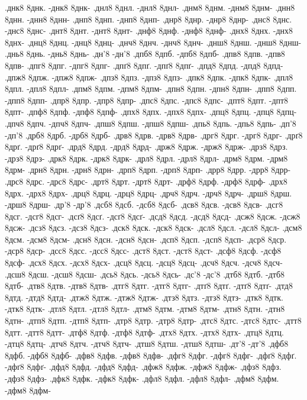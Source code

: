 {.днк8 8днк. -днк8 8днк-
.днл8 8днл. -днл8 8днл-
.днм8 8днм. -днм8 8днм-
.днн8 8днн. -днн8 8днн-
.днп8 8днп. -днп8 8днп-
.днр8 8днр. -днр8 8днр-
.днс8 8днс. -днс8 8днс-
.днт8 8днт. -днт8 8днт-
.днф8 8днф. -днф8 8днф-
.днх8 8днх. -днх8 8днх-
.днц8 8днц. -днц8 8днц-
.днч8 8днч. -днч8 8днч-
.днш8 8днш. -днш8 8днш-
.днь8 8днь. -днь8 8днь-
.дн'8 -дн'8
.дпб8 8дпб. -дпб8 8дпб-
.дпв8 8дпв. -дпв8 8дпв-
.дпг8 8дпг. -дпг8 8дпг-
.дпґ8 8дпґ. -дпґ8 8дпґ-
.дпд8 8дпд. -дпд8 8дпд-
.дпж8 8дпж. -дпж8 8дпж-
.дпз8 8дпз. -дпз8 8дпз-
.дпк8 8дпк. -дпк8 8дпк-
.дпл8 8дпл. -дпл8 8дпл-
.дпм8 8дпм. -дпм8 8дпм-
.дпн8 8дпн. -дпн8 8дпн-
.дпп8 8дпп. -дпп8 8дпп-
.дпр8 8дпр. -дпр8 8дпр-
.дпс8 8дпс. -дпс8 8дпс-
.дпт8 8дпт. -дпт8 8дпт-
.дпф8 8дпф. -дпф8 8дпф-
.дпх8 8дпх. -дпх8 8дпх-
.дпц8 8дпц. -дпц8 8дпц-
.дпч8 8дпч. -дпч8 8дпч-
.дпш8 8дпш. -дпш8 8дпш-
.дпь8 8дпь. -дпь8 8дпь-
.дп'8 -дп'8
.дрб8 8дрб. -дрб8 8дрб-
.дрв8 8дрв. -дрв8 8дрв-
.дрг8 8дрг. -дрг8 8дрг-
.дрґ8 8дрґ. -дрґ8 8дрґ-
.дрд8 8дрд. -дрд8 8дрд-
.држ8 8држ. -држ8 8држ-
.дрз8 8дрз. -дрз8 8дрз-
.дрк8 8дрк. -дрк8 8дрк-
.дрл8 8дрл. -дрл8 8дрл-
.дрм8 8дрм. -дрм8 8дрм-
.дрн8 8дрн. -дрн8 8дрн-
.дрп8 8дрп. -дрп8 8дрп-
.дрр8 8дрр. -дрр8 8дрр-
.дрс8 8дрс. -дрс8 8дрс-
.дрт8 8дрт. -дрт8 8дрт-
.дрф8 8дрф. -дрф8 8дрф-
.дрх8 8дрх. -дрх8 8дрх-
.дрц8 8дрц. -дрц8 8дрц-
.дрч8 8дрч. -дрч8 8дрч-
.дрш8 8дрш. -дрш8 8дрш-
.др'8 -др'8
.дсб8 8дсб. -дсб8 8дсб-
.дсв8 8дсв. -дсв8 8дсв-
.дсг8 8дсг. -дсг8 8дсг-
.дсґ8 8дсґ. -дсґ8 8дсґ-
.дсд8 8дсд. -дсд8 8дсд-
.дсж8 8дсж. -дсж8 8дсж-
.дсз8 8дсз. -дсз8 8дсз-
.дск8 8дск. -дск8 8дск-
.дсл8 8дсл. -дсл8 8дсл-
.дсм8 8дсм. -дсм8 8дсм-
.дсн8 8дсн. -дсн8 8дсн-
.дсп8 8дсп. -дсп8 8дсп-
.дср8 8дср. -дср8 8дср-
.дсс8 8дсс. -дсс8 8дсс-
.дст8 8дст. -дст8 8дст-
.дсф8 8дсф. -дсф8 8дсф-
.дсх8 8дсх. -дсх8 8дсх-
.дсц8 8дсц. -дсц8 8дсц-
.дсч8 8дсч. -дсч8 8дсч-
.дсш8 8дсш. -дсш8 8дсш-
.дсь8 8дсь. -дсь8 8дсь-
.дс'8 -дс'8
.дтб8 8дтб. -дтб8 8дтб-
.дтв8 8дтв. -дтв8 8дтв-
.дтг8 8дтг. -дтг8 8дтг-
.дтґ8 8дтґ. -дтґ8 8дтґ-
.дтд8 8дтд. -дтд8 8дтд-
.дтж8 8дтж. -дтж8 8дтж-
.дтз8 8дтз. -дтз8 8дтз-
.дтк8 8дтк. -дтк8 8дтк-
.дтл8 8дтл. -дтл8 8дтл-
.дтм8 8дтм. -дтм8 8дтм-
.дтн8 8дтн. -дтн8 8дтн-
.дтп8 8дтп. -дтп8 8дтп-
.дтр8 8дтр. -дтр8 8дтр-
.дтс8 8дтс. -дтс8 8дтс-
.дтт8 8дтт. -дтт8 8дтт-
.дтф8 8дтф. -дтф8 8дтф-
.дтх8 8дтх. -дтх8 8дтх-
.дтц8 8дтц. -дтц8 8дтц-
.дтч8 8дтч. -дтч8 8дтч-
.дтш8 8дтш. -дтш8 8дтш-
.дт'8 -дт'8
.дфб8 8дфб. -дфб8 8дфб-
.дфв8 8дфв. -дфв8 8дфв-
.дфг8 8дфг. -дфг8 8дфг-
.дфґ8 8дфґ. -дфґ8 8дфґ-
.дфд8 8дфд. -дфд8 8дфд-
.дфж8 8дфж. -дфж8 8дфж-
.дфз8 8дфз. -дфз8 8дфз-
.дфк8 8дфк. -дфк8 8дфк-
.дфл8 8дфл. -дфл8 8дфл-
.дфм8 8дфм. -дфм8 8дфм-
}
